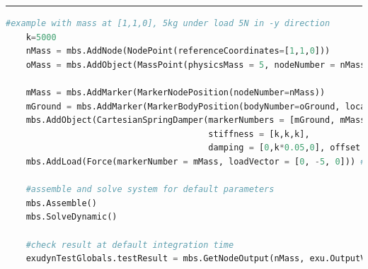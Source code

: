 \vspace{6pt}\par\noindent\rule{\textwidth}{0.4pt}
\label{miniExample_ObjectConnectorCartesianSpringDamper}
\pythonstyle
\begin{lstlisting}[language=Python, firstnumber=1]
    #example with mass at [1,1,0], 5kg under load 5N in -y direction
    k=5000
    nMass = mbs.AddNode(NodePoint(referenceCoordinates=[1,1,0]))
    oMass = mbs.AddObject(MassPoint(physicsMass = 5, nodeNumber = nMass))
    
    mMass = mbs.AddMarker(MarkerNodePosition(nodeNumber=nMass))
    mGround = mbs.AddMarker(MarkerBodyPosition(bodyNumber=oGround, localPosition = [1,1,0]))
    mbs.AddObject(CartesianSpringDamper(markerNumbers = [mGround, mMass], 
                                        stiffness = [k,k,k], 
                                        damping = [0,k*0.05,0], offset = [0,0,0]))
    mbs.AddLoad(Force(markerNumber = mMass, loadVector = [0, -5, 0])) #static solution=-5/5000=-0.001m

    #assemble and solve system for default parameters
    mbs.Assemble()
    mbs.SolveDynamic()

    #check result at default integration time
    exudynTestGlobals.testResult = mbs.GetNodeOutput(nMass, exu.OutputVariableType.Displacement)[1]
\end{lstlisting}

